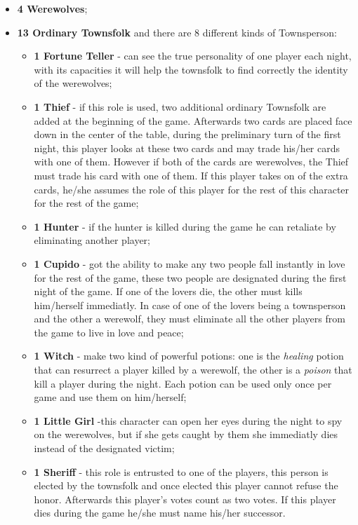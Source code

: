 \documentclass{article}
\begin{document}
\begin{itemize}
	\item \textbf{4 Werewolves}; 	
	\item \textbf{13 Ordinary Townsfolk} and there are 8 different kinds of Townsperson: 
	\begin{itemize}
		\item \textbf{1 Fortune Teller} - can see the true personality of one player each night, with its capacities it will help the townsfolk to find  correctly the identity of the werewolves;
		\item \textbf{1 Thief} - if this role is used, two additional ordinary Townsfolk are added at the beginning of the game. Afterwards two cards are placed face down in the center of the table, during the preliminary turn of the first night, this player looks at these two cards and may trade his/her cards with one of them. However if both of the cards are werewolves, the Thief must trade his card with one of them. If this player takes on of the extra cards, he/she assumes the role of this player for the rest of this character for the rest of the game;
		\item \textbf{1 Hunter} - if the hunter is killed during the game he can retaliate by eliminating another player;
		\item \textbf{1 Cupido} - got the ability to make any two people fall instantly in love for the rest of the game, these two people are designated during the first night of the game. If one of the lovers die, the other must kills him/herself immediatly. In case of one of the lovers being a townsperson and the other a werewolf, they must eliminate all the other players from the game to live in love and peace;
		\item \textbf{1 Witch} - make two kind of powerful potions: one is the \textit{healing} potion that can resurrect a player killed by a werewolf, the other is a \textit{poison} that kill a player during the night. Each potion can be used only once per game and use them on him/herself;
		\item \textbf{1 Little Girl} -this character can open her eyes during the night to spy on the werewolves, but if she gets caught by them she immediatly dies instead of the designated victim;
		\item \textbf{1 Sheriff} - this role is entrusted to one of the players, this person is elected by the townsfolk and once elected this player cannot refuse the honor. Afterwards this player's votes count as two votes. If this player dies during the game he/she must name his/her successor.
	\end{itemize}
\end{itemize}
\end{document}
